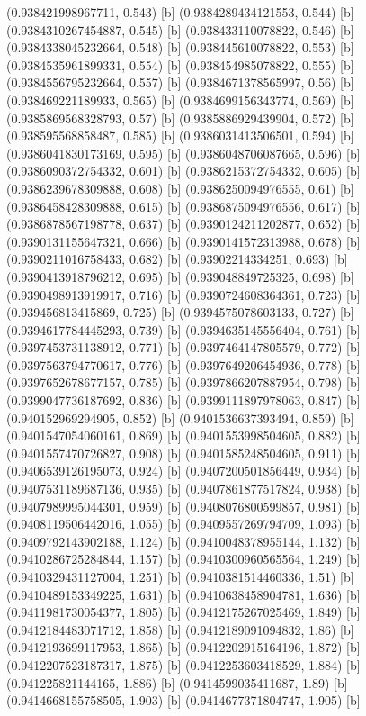 {{{(0.938421998967711, 0.543) [b] 
(0.9384289434121553, 0.544) [b] 
(0.9384310267454887, 0.545) [b] 
(0.938433110078822, 0.546) [b] 
(0.9384338045232664, 0.548) [b] 
(0.938445610078822, 0.553) [b] 
(0.9384535961899331, 0.554) [b] 
(0.938454985078822, 0.555) [b] 
(0.9384556795232664, 0.557) [b] 
(0.9384671378565997, 0.56) [b] 
(0.938469221189933, 0.565) [b] 
(0.9384699156343774, 0.569) [b] 
(0.9385869568328793, 0.57) [b] 
(0.9385886929439904, 0.572) [b] 
(0.938595568858487, 0.585) [b] 
(0.9386031413506501, 0.594) [b] 
(0.9386041830173169, 0.595) [b] 
(0.9386048706087665, 0.596) [b] 
(0.9386090372754332, 0.601) [b] 
(0.9386215372754332, 0.605) [b] 
(0.9386239678309888, 0.608) [b] 
(0.9386250094976555, 0.61) [b] 
(0.9386458428309888, 0.615) [b] 
(0.9386875094976556, 0.617) [b] 
(0.9386878567198778, 0.637) [b] 
(0.9390124211202877, 0.652) [b] 
(0.9390131155647321, 0.666) [b] 
(0.9390141572313988, 0.678) [b] 
(0.9390211016758433, 0.682) [b] 
(0.93902214334251, 0.693) [b] 
(0.9390413918796212, 0.695) [b] 
(0.939048849725325, 0.698) [b] 
(0.9390498913919917, 0.716) [b] 
(0.9390724608364361, 0.723) [b] 
(0.939456813415869, 0.725) [b] 
(0.9394575078603133, 0.727) [b] 
(0.9394617784445293, 0.739) [b] 
(0.9394635145556404, 0.761) [b] 
(0.9397453731138912, 0.771) [b] 
(0.9397464147805579, 0.772) [b] 
(0.9397563794770617, 0.776) [b] 
(0.9397649206454936, 0.778) [b] 
(0.9397652678677157, 0.785) [b] 
(0.9397866207887954, 0.798) [b] 
(0.9399047736187692, 0.836) [b] 
(0.9399111897978063, 0.847) [b] 
(0.940152969294905, 0.852) [b] 
(0.9401536637393494, 0.859) [b] 
(0.9401547054060161, 0.869) [b] 
(0.9401553998504605, 0.882) [b] 
(0.9401557470726827, 0.908) [b] 
(0.9401585248504605, 0.911) [b] 
(0.9406539126195073, 0.924) [b] 
(0.9407200501856449, 0.934) [b] 
(0.9407531189687136, 0.935) [b] 
(0.9407861877517824, 0.938) [b] 
(0.9407989995044301, 0.959) [b] 
(0.9408076800599857, 0.981) [b] 
(0.9408119506442016, 1.055) [b] 
(0.9409557269794709, 1.093) [b] 
(0.9409792143902188, 1.124) [b] 
(0.9410048378955144, 1.132) [b] 
(0.9410286725284844, 1.157) [b] 
(0.9410300960565564, 1.249) [b] 
(0.9410329431127004, 1.251) [b] 
(0.9410381514460336, 1.51) [b] 
(0.9410489153349225, 1.631) [b] 
(0.9410638458904781, 1.636) [b] 
(0.9411981730054377, 1.805) [b] 
(0.9412175267025469, 1.849) [b] 
(0.9412184483071712, 1.858) [b] 
(0.9412189091094832, 1.86) [b] 
(0.9412193699117953, 1.865) [b] 
(0.9412202915164196, 1.872) [b] 
(0.9412207523187317, 1.875) [b] 
(0.9412253603418529, 1.884) [b] 
(0.941225821144165, 1.886) [b] 
(0.9414599035411687, 1.89) [b] 
(0.9414668155758505, 1.903) [b] 
(0.9414677371804747, 1.905) [b] 
}}}
